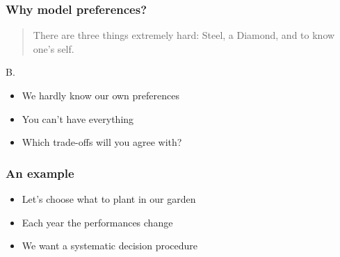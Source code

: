 \documentclass[french,english]{beamer}
\begin{document}
\begin{frame}
	\frametitle{Why model preferences?}
	
	\begin{quote}
		There are three things extremely hard: Steel, a Diamond, and to know one's self.
	\end{quote}
	{\scriptsize\vspace{-2em}
	\begin{flushright}
		B. \citet[p. 179]{franklin_poor_2004}
	\end{flushright}
	}
	\begin{itemize}
		\item We hardly know our own preferences
		\item You can’t have everything
		\item Which trade-offs will you agree with?
	\end{itemize}
\end{frame}

\begin{frame}
	\frametitle{An example}
	\begin{itemize}
		\item Let’s choose what to plant in our garden
		\item Each year the performances change
		\item We want a systematic decision procedure
	\end{itemize}
	\begin{center}
	\end{center}
\end{frame}
\end{document}
